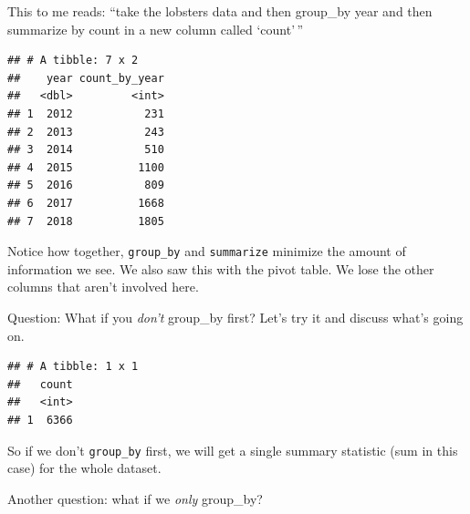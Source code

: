 \documentclass[]{book}
\newenvironment{Shaded}{\begin{snugshade}}{\end{snugshade}}
\newcommand{\DataTypeTok}[1]{\textcolor[rgb]{0.13,0.29,0.53}{#1}}
\newcommand{\KeywordTok}[1]{\textcolor[rgb]{0.13,0.29,0.53}{\textbf{#1}}}
\newcommand{\NormalTok}[1]{#1}
\newcommand{\OperatorTok}[1]{\textcolor[rgb]{0.81,0.36,0.00}{\textbf{#1}}}
\newcommand{\StringTok}[1]{\textcolor[rgb]{0.31,0.60,0.02}{#1}}
\begin{document}
This to me reads: ``take the lobsters data and then group\_by year and then summarize by count in a new column called `count'\,''

\begin{Shaded}
\end{Shaded}

\begin{verbatim}
## # A tibble: 7 x 2
##    year count_by_year
##   <dbl>         <int>
## 1  2012           231
## 2  2013           243
## 3  2014           510
## 4  2015          1100
## 5  2016           809
## 6  2017          1668
## 7  2018          1805
\end{verbatim}

Notice how together, \texttt{group\_by} and \texttt{summarize} minimize the amount of information we see. We also saw this with the pivot table. We lose the other columns that aren't involved here.

Question: What if you \emph{don't} group\_by first? Let's try it and discuss what's going on.

\begin{Shaded}
\end{Shaded}

\begin{verbatim}
## # A tibble: 1 x 1
##   count
##   <int>
## 1  6366
\end{verbatim}

So if we don't \texttt{group\_by} first, we will get a single summary statistic (sum in this case) for the whole dataset.

Another question: what if we \emph{only} group\_by?

\begin{Shaded}
\end{Shaded}
\end{document}
